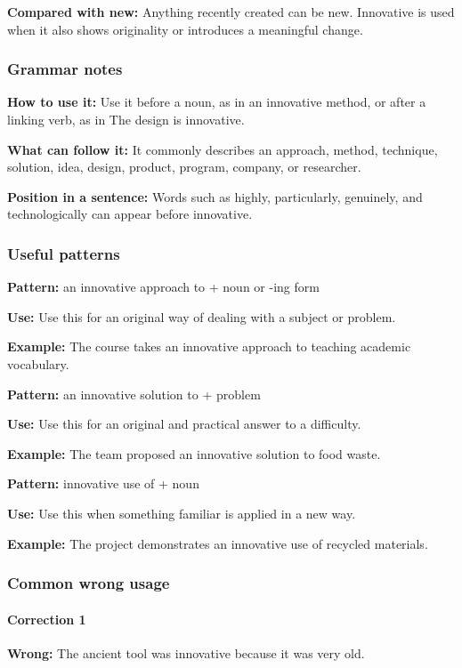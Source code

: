 \documentclass[11pt]{article}
\begin{document}
\textbf{Compared with new:} Anything recently created can be new. Innovative is used when it also shows originality or introduces a meaningful change.

\subsubsection{Grammar notes}
\textbf{How to use it:} Use it before a noun, as in an innovative method, or after a linking verb, as in The design is innovative.

\textbf{What can follow it:} It commonly describes an approach, method, technique, solution, idea, design, product, program, company, or researcher.

\textbf{Position in a sentence:} Words such as highly, particularly, genuinely, and technologically can appear before innovative.

\subsubsection{Useful patterns}
\textbf{Pattern:} an innovative approach to + noun or -ing form

\textbf{Use:} Use this for an original way of dealing with a subject or problem.

\textbf{Example:} The course takes an innovative approach to teaching academic vocabulary.

\textbf{Pattern:} an innovative solution to + problem

\textbf{Use:} Use this for an original and practical answer to a difficulty.

\textbf{Example:} The team proposed an innovative solution to food waste.

\textbf{Pattern:} innovative use of + noun

\textbf{Use:} Use this when something familiar is applied in a new way.

\textbf{Example:} The project demonstrates an innovative use of recycled materials.

\subsubsection{Common wrong usage}
\paragraph{Correction 1}
\textbf{Wrong:} The ancient tool was innovative because it was very old.
\end{document}

